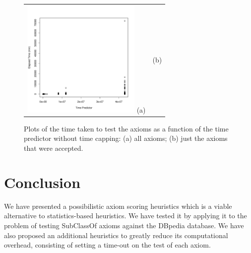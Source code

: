 \documentclass{llncs}
\begin{document}
\begin{figure}[t]
\begin{center}
  \begin{tabular}{cc}
    \includegraphics[height=2.25in]{time-tp} 
    (a) & (b)
  \end{tabular}
\end{center}
\caption{Plots of the time taken to test the axioms as a function of the time predictor
  without time capping: (a) all axioms; (b) just the axioms that were accepted.}
\label{fig:time-tp}
\end{figure}



\section{Conclusion}

We have presented a possibilistic axiom scoring heuristics which is a viable
alternative to statistics-based heuristics. We have tested it by applying it to the
problem of testing \textsf{SubClassOf} axioms against the DBpedia database.
We have also proposed an additional heuristics to greatly reduce its computational
overhead, consisting of setting a time-out on the test of each axiom.
\end{document}
